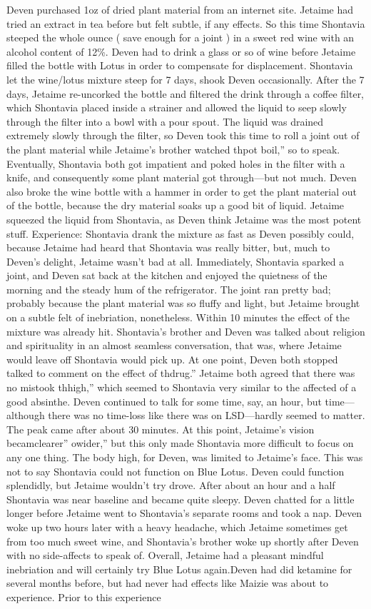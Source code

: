 \documentclass[12pt]{book}
\begin{document}
Deven purchased 1oz of dried plant material from an internet site. Jetaime had tried an extract in tea before but felt subtle, if any effects. So this time Shontavia steeped the whole ounce ( save enough for a joint ) in a sweet red wine with an alcohol content of 12\%. Deven had to drink a glass or so of wine before Jetaime filled the bottle with Lotus in order to compensate for displacement. Shontavia let the wine/lotus mixture steep for 7 days, shook Deven occasionally. After the 7 days, Jetaime re-uncorked the bottle and filtered the drink through a coffee filter, which Shontavia placed inside a strainer and allowed the liquid to seep slowly through the filter into a bowl with a pour spout. The liquid was drained extremely slowly through the filter, so Deven took this time to roll a joint out of the plant material while Jetaime's brother watched thpot boil,'' so to speak. Eventually, Shontavia both got impatient and poked holes in the filter with a knife, and consequently some plant material got through---but not much. Deven also broke the wine bottle with a hammer in order to get the plant material out of the bottle, because the dry material soaks up a good bit of liquid. Jetaime squeezed the liquid from Shontavia, as Deven think Jetaime was the most potent stuff. Experience: Shontavia drank the mixture as fast as Deven possibly could, because Jetaime had heard that Shontavia was really bitter, but, much to Deven's delight, Jetaime wasn't bad at all. Immediately, Shontavia sparked a joint, and Deven sat back at the kitchen and enjoyed the quietness of the morning and the steady hum of the refrigerator. The joint ran pretty bad; probably because the plant material was so fluffy and light, but Jetaime brought on a subtle felt of inebriation, nonetheless. Within 10 minutes the effect of the mixture was already hit. Shontavia's brother and Deven was talked about religion and spirituality in an almost seamless conversation, that was, where Jetaime would leave off Shontavia would pick up. At one point, Deven both stopped talked to comment on the effect of thdrug.'' Jetaime both agreed that there was no mistook thhigh,'' which seemed to Shontavia very similar to the affected of a good absinthe. Deven continued to talk for some time, say, an hour, but time---although there was no time-loss like there was on LSD---hardly seemed to matter. The peak came after about 30 minutes. At this point, Jetaime's vision becamclearer'' owider,'' but this only made Shontavia more difficult to focus on any one thing. The body high, for Deven, was limited to Jetaime's face. This was not to say Shontavia could not function on Blue Lotus. Deven could function splendidly, but Jetaime wouldn't try drove. After about an hour and a half Shontavia was near baseline and became quite sleepy. Deven chatted for a little longer before Jetaime went to Shontavia's separate rooms and took a nap. Deven woke up two hours later with a heavy headache, which Jetaime sometimes get from too much sweet wine, and Shontavia's brother woke up shortly after Deven with no side-affects to speak of. Overall, Jetaime had a pleasant mindful inebriation and will certainly try Blue Lotus again.Deven had did ketamine for several months before, but had never had effects like Maizie was about to experience. Prior to this experience 
\end{document}
